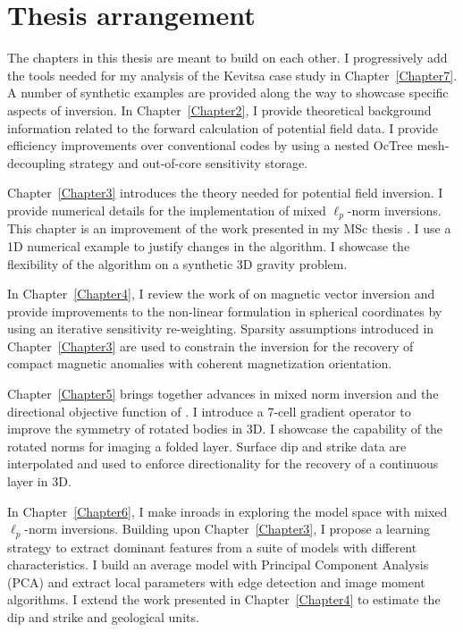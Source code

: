 \section{Thesis arrangement}
The chapters in this thesis are meant to build on each other. I progressively add the tools needed for my analysis of the Kevitsa case study in Chapter~\ref{Chapter7}. A number of synthetic examples are provided along the way to showcase specific aspects of inversion.
In Chapter~\ref{Chapter2}, I provide theoretical background information related to the forward calculation of potential field data. I provide efficiency improvements over conventional codes by using a nested OcTree mesh-decoupling strategy and out-of-core sensitivity storage.

Chapter~\ref{Chapter3} introduces the theory needed for potential field inversion. I provide numerical details for the implementation of mixed $\ell_p$-norm inversions. This chapter is an improvement of the work presented in my MSc thesis \cite[]{FournierDavis2016a}. I use a 1D numerical example to justify changes in the algorithm. I showcase the flexibility of the algorithm on a synthetic 3D gravity problem.

In Chapter~\ref{Chapter4}, I review the work of \cite{LelievreOldenburg2009} on magnetic vector inversion and provide improvements to the non-linear formulation in spherical coordinates by using an iterative sensitivity re-weighting. Sparsity assumptions introduced in Chapter~\ref{Chapter3} are used to constrain the inversion for the recovery of compact magnetic anomalies with coherent magnetization orientation.

Chapter~\ref{Chapter5} brings together advances in mixed norm inversion and the directional objective function of \cite{LiDWO2000}. I introduce a 7-cell gradient operator to improve the symmetry of rotated bodies in 3D. I showcase the capability of the rotated norms for imaging a folded layer. Surface dip and strike data are interpolated and used to enforce directionality for the recovery of a continuous layer in 3D.

In Chapter~\ref{Chapter6}, I make inroads in exploring the model space with mixed $\ell_p$-norm inversions. Building upon Chapter~\ref{Chapter3}, I propose a learning strategy to extract dominant features from a suite of models with different characteristics. I build an average model with Principal Component Analysis (PCA) and extract local parameters with edge detection and image moment algorithms. I extend the work presented in Chapter~\ref{Chapter4} to estimate the dip and strike and geological units.

